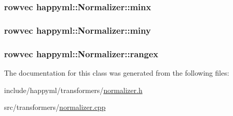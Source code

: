 \subsubsection[{\texorpdfstring{minx}{minx}}]{\setlength{\rightskip}{0pt plus 5cm}rowvec happyml\+::\+Normalizer\+::minx\hspace{0.3cm}{\ttfamily [protected]}}\hypertarget{classhappyml_1_1Normalizer_a0e7aece7fcdc71c49f6f4ecde5421a35}{}\label{classhappyml_1_1Normalizer_a0e7aece7fcdc71c49f6f4ecde5421a35}
\subsubsection[{\texorpdfstring{miny}{miny}}]{\setlength{\rightskip}{0pt plus 5cm}rowvec happyml\+::\+Normalizer\+::miny\hspace{0.3cm}{\ttfamily [protected]}}\hypertarget{classhappyml_1_1Normalizer_a793ede833b7279317f1ddca6ad8cbf66}{}\label{classhappyml_1_1Normalizer_a793ede833b7279317f1ddca6ad8cbf66}
\subsubsection[{\texorpdfstring{rangex}{rangex}}]{\setlength{\rightskip}{0pt plus 5cm}rowvec happyml\+::\+Normalizer\+::rangex\hspace{0.3cm}{\ttfamily [protected]}}\hypertarget{classhappyml_1_1Normalizer_a3d6e869c3bbab4e960a219ff69c8a597}{}\label{classhappyml_1_1Normalizer_a3d6e869c3bbab4e960a219ff69c8a597}


The documentation for this class was generated from the following files\+:\begin{DoxyCompactItemize}
\item 
include/happyml/transformers/\hyperlink{normalizer_8h}{normalizer.\+h}\item 
src/transformers/\hyperlink{normalizer_8cpp}{normalizer.\+cpp}\end{DoxyCompactItemize}
